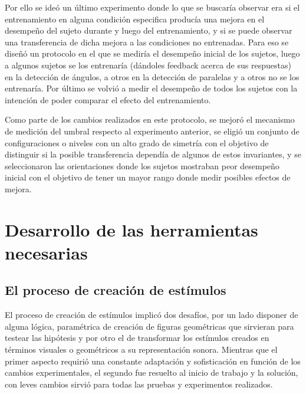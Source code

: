 \documentclass{article}
\numberwithin{figure}{section}
\begin{document}
    Por ello se ideó un último experimento donde lo que se buscaría observar era si el entrenamiento en alguna condición especifica producía una mejora en el desempeño del sujeto durante y luego del entrenamiento, y si se puede observar una transferencia de dicha mejora a las condiciones no entrenadas. Para eso se diseñó un protocolo en el que se mediría el desempeño inicial de los sujetos, luego a algunos sujetos se los entrenaría (dándoles feedback acerca de sus respuestas) en la detección de ángulos, a otros en la detección de paralelas y a otros no se los entrenaría. Por último se volvió a medir el desempeño de todos los sujetos con la intención de poder comparar el efecto del entrenamiento. 
    
    Como parte de los cambios realizados en este protocolo, se mejoró el mecanismo de medición del umbral respecto al experimento anterior, se eligió un conjunto de configuraciones o niveles con un alto grado de simetría con el objetivo de distinguir si la posible transferencia dependía de algunos de estos invariantes, y se seleccionaron las orientaciones donde los sujetos mostraban peor desempeño inicial con el objetivo de tener un mayor rango donde medir posibles efectos de mejora. 
    
\section{Desarrollo de las herramientas necesarias}

\subsection{El proceso de creación de estímulos} \label{seccion:SVG}
    
    El proceso de creación de estímulos implicó dos desafíos, por un lado disponer de alguna lógica, paramétrica de creación de figuras geométricas que sirvieran para testear las hipótesis y por otro el de transformar los estímulos creados en términos visuales o geométricos a su representación sonora. Mientras que el primer aspecto requirió una constante adaptación y sofisticación en función de los cambios experimentales, el segundo fue resuelto al inicio de trabajo y la solución, con leves cambios sirvió para todas las pruebas y experimentos realizados. 
    
\end{document}
